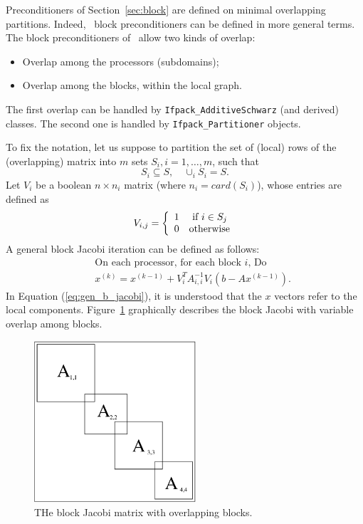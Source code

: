 \bigskip

Preconditioners of Section~\ref{sec:block} are defined on minimal overlapping
partitions. Indeed, \ifpack\ block preconditioners can be defined in more
general terms. The block preconditioners of \ifpack\ 
allow two kinds of overlap:
\begin{itemize}
\item Overlap among the processors (subdomains);
\item Overlap among the blocks, within the local graph.
\end{itemize}
The first overlap can be handled by \verb!Ifpack_AdditiveSchwarz! (and
derived) classes. The second one is handled by \verb!Ifpack_Partitioner!
objects.

To fix the notation, let us suppose to partition the set of (local) rows of 
the (overlapping) matrix into $m$ sets $S_i, i=1, \ldots,m$, such that
\[
S_i \subseteq S, \quad \cup_i S_i = S.
\]
Let $V_i$ be a
boolean $n \times n_i$ matrix (where $n_i = card(S_i)$), whose entries are
defined as
\[
V_{i,j} = \left\{
\begin{array}{l l}
1 & \mbox{ if } i \in S_j \\
  0 & \mbox{otherwise}
\end{array}
  \right.
\]
A general block Jacobi iteration can be defined as follows:
\begin{eqnarray}
&& \mbox{On each processor, for each block $i$, Do} \\
&& \label{eq:gen_b_jacobi}
x^{(k)} = x^{(k-1)} + V_i^T A_{i,i}^{-1} V_i(b - A x^{(k-1)}).
\end{eqnarray}
In Equation (\ref{eq:gen_b_jacobi}), it is understood that the $x$ vectors
refer to the local components.
Figure~\ref{fig:bj} graphically describes the block Jacobi with variable
overlap among blocks.

\begin{figure}
\begin{center}
\includegraphics[width=6cm]{bj.eps}
\end{center}
\caption{THe block Jacobi matrix with overlapping blocks.}
\label{fig:bj}
\end{figure}

